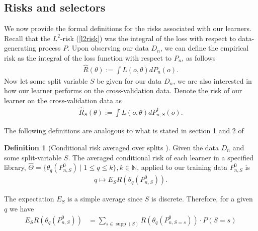 \documentclass[11pt, a4paper]{article}
\theoremstyle{definition}
\newtheorem{definition}[theorem]{Definition}
\theoremstyle{remark}
\newcommand{\q}{q}
\newcommand{\ml}{k}
\newcommand{\btheta}{\theta}
\begin{document}
\subsection{Risks and selectors}
We now provide the formal definitions for the risks associated with our learners. Recall that the $L^2$-risk (\ref{l2risk}) was the integral of the loss with respect to data-generating process $P$. Upon observing our data $D_n$, we can define the empirical risk as the integral of the loss function with respect to $P_n$, as follows
\begin{align*}
    \hat{R}(\btheta) := \int L(o, \btheta) d P_{n}(o).
\end{align*}
 Now let some split variable $ S $ be given for our data $ D_n $, we are also interested in how our learner performs on the cross-validation data. Denote the risk of our learner on the cross-validation data as 
 \begin{align*}
     \hat{R}_S(\theta) :=  \int L(o, \btheta) d P_{n,S}^{1}(o).
 \end{align*}
 
 The following definitions are analogous to what is stated in section 1 and 2 of  \cite{laan03}
 \begin{definition}[Conditional risk averaged over splits \cite{vaart06}]
    Given the data $ D_n $ and some split-variable $ S $. The averaged conditional risk of each learner in a specified library, $ \hat{\Theta} = \{ \btheta_{\q}(P_{n, S}^{0}) \mid 1 \leq \q \leq \ml \}, \ml \in \mathbb{N} $, applied to our training data $ P_{n, S}^{0} $ is 
    \begin{align*}
        \q \mapsto E_S R( \btheta_\q(P_{n,S}^{0})).
    \end{align*}
\end{definition}
The expectation $ E_S $ is a simple average since $ S $ is discrete. Therefore, for a given $ \q $ we have 
\begin{align*}
    E_S R( \btheta_\q(P_{n,S}^{0})) &= \sum_{s \in \operatorname{supp}(S)} R(\theta_{q}(P_{n, S = s}^{0})) \cdot P(S = s) 
\end{align*}
\end{document}
